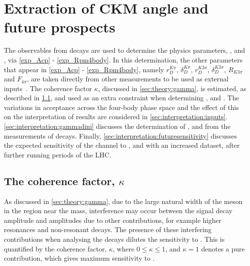 \clearpage
%

\chapter{\label{ch:6-interpretation}Extraction of CKM angle \Pgamma and future prospects} 


The \CP observables from \btodkst decays are used to determine the physics parameters, \rb, \deltab and \Pgamma, via \eqns\ref{exp_Acp} - \ref{exp_Rpm4body}. In this determination, the other parameters that appear in \eqns\ref{exp_Acp} - \ref{exp_Rpm4body}, namely $r_D^{K\pi}$, $\delta_D^{K\pi}$, $r_D^{K3\pi}$, $\delta_D^{K3\pi}$, $R_{K3\pi}$ and $F_{4\pi}$, are taken directly from other measurements to be used as external inputs~\cite{HFAG,charmk3pi,charmk3pi_errata,charm4pi}. The coherence factor $\kappa$, discussed in \sect\ref{sec:theory:gamma}, is estimated, as described in \sect\ref{sec:interpretation:coherence}, and used as an extra constraint when determining \rb, \deltab and \Pgamma. The variations in acceptance across the four-body phase space and the effect of this on the interpretation of results are considered in \sect\ref{sec:interpretation:inputs}. \Sect\ref{sec:interpretation:gammadini} discusses the determination of \rb, \deltab and \Pgamma from the measurements of \btodkst decays. Finally, \sect\ref{sec:interpretation:futuresensitivity} discusses the expected sensitivity of the \btodkst channel to \rb, \deltab and \Pgamma with an increased dataset, after further running periods of the LHC.

\section{The coherence factor, $\kappa$}
\label{sec:interpretation:coherence}

As discussed in \sect\ref{sec:theory:gamma}, due to the large natural width of the \Kstarm meson in the region near the \Kstarm mass, interference may occur between the signal \Kstarm decay amplitude and amplitudes due to other \decay{\Bm}{\D\KS\pim} contributions, for example higher \KS\pim resonances and non-resonant decays. The presence of these interfering contributions when analysing the \btodkst decays dilutes the sensitivity to \Pgamma. This is quantified by the coherence factor, $\kappa$, where $0 \leq \kappa \leq 1$, and $\kappa = 1$ denotes a pure \Kstarm contribution, which gives maximum sensitivity to \Pgamma. 

